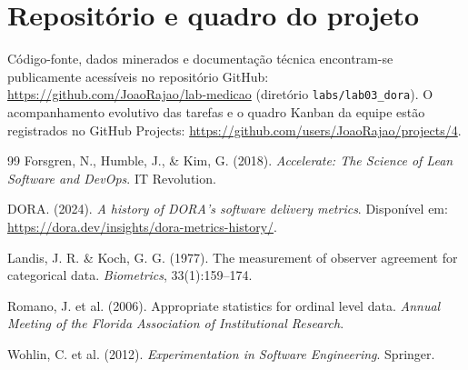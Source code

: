 \documentclass[12pt]{article}
\begin{document}
\section{Repositório e quadro do projeto}

Código-fonte, dados minerados e documentação técnica encontram-se publicamente acessíveis no repositório GitHub: \url{https://github.com/JoaoRajao/lab-medicao} (diretório \texttt{labs/lab03\_dora}). O acompanhamento evolutivo das tarefas e o quadro Kanban da equipe estão registrados no GitHub Projects: \url{https://github.com/users/JoaoRajao/projects/4}.


\begin{thebibliography}{99}
Forsgren, N., Humble, J., \& Kim, G. (2018). \textit{Accelerate: The Science of Lean Software and DevOps}. IT Revolution.

DORA. (2024). \textit{A history of DORA's software delivery metrics}. Disponível em: \url{https://dora.dev/insights/dora-metrics-history/}.

Landis, J. R. \& Koch, G. G. (1977). The measurement of observer agreement for categorical data. \textit{Biometrics}, 33(1):159--174.

Romano, J. et al. (2006). Appropriate statistics for ordinal level data. \textit{Annual Meeting of the Florida Association of Institutional Research}.

Wohlin, C. et al. (2012). \textit{Experimentation in Software Engineering}. Springer.
\end{thebibliography}
\end{document}
